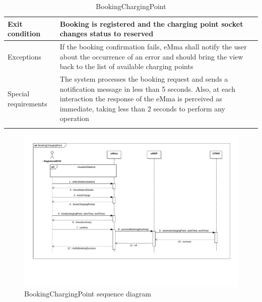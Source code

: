 \begin{center}
\begin{longtable}{p{4cm} p{11cm}}
     \hline
     Exit condition &  Booking is registered and the charging point socket changes status to reserved\\
     \hline
     Exceptions &
        If the booking confirmation fails, eMma shall notify the user about the occurrence of an error and should bring the view back to the list of available charging points\\
     \hline
     Special requirements &  
        The system processes the booking request and sends a notification message in less than 5 seconds. Also, at each interaction the response of the eMma is perceived as immediate, taking less than 2 seconds to perform any operation\\
     \hline
    \caption{BookingChargingPoint}
    \label{tab:BookingChargingPoint}
    \end{longtable}
\end{center}
\begin{figure}[H]
    \centering
    \includegraphics[width=\textwidth, trim={0 3cm 0 0}, clip]{Images/cp3/seqDiagrams/BookChargingPoint.pdf}
    \caption{BookingChargingPoint sequence diagram}
\end{figure}

